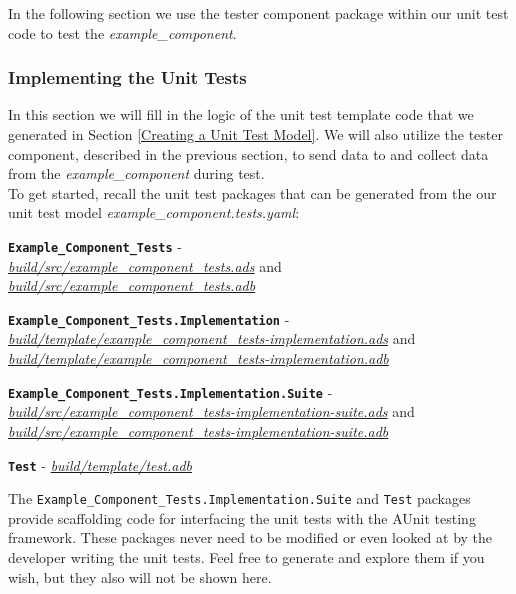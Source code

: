 In the following section we use the tester component package within our unit test code to test the \textit{example\_component}.

\subsubsection{Implementing the Unit Tests}

In this section we will fill in the logic of the unit test template code that we generated in Section \ref{Creating a Unit Test Model}. We will also utilize the tester component, described in the previous section, to send data to and collect data from the \textit{example\_component} during test. \\

To get started, recall the unit test packages that can be generated from the our unit test model \textit{example\_component.tests.yaml}:

\vspace{5mm} %
\begin{spaceditemize}
  \item \textbf{\texttt{Example\_Component\_Tests}} - \\ \textit{\url{build/src/example\_component\_tests.ads}} and \\ \textit{\url{build/src/example\_component\_tests.adb}}
  \item \textbf{\texttt{Example\_Component\_Tests.Implementation}} - \\ \textit{\url{build/template/example\_component\_tests-implementation.ads}} and \\ \textit{\url{build/template/example\_component\_tests-implementation.adb}}
  \item \textbf{\texttt{Example\_Component\_Tests.Implementation.Suite}} - \\ \textit{\url{build/src/example\_component\_tests-implementation-suite.ads}} and \\ \textit{\url{build/src/example\_component\_tests-implementation-suite.adb}}
  \item \textbf{\texttt{Test}} - \textit{\url{build/template/test.adb}}
\end{spaceditemize}
\vspace{5mm} %

The \texttt{Example\_Component\_Tests.Implementation.Suite} and \texttt{Test} packages provide scaffolding code for interfacing the unit tests with the AUnit testing framework. These packages never need to be modified or even looked at by the developer writing the unit tests. Feel free to generate and explore them if you wish, but they also will not be shown here. \\

